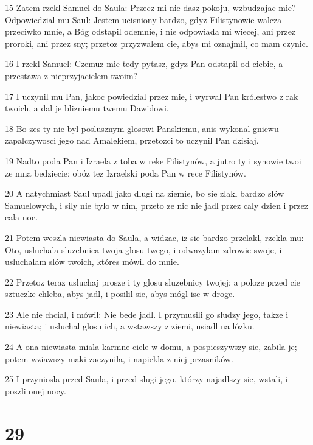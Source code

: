\par 15 Zatem rzekl Samuel do Saula: Przecz mi nie dasz pokoju, wzbudzajac mie? Odpowiedzial mu Saul: Jestem ucisniony bardzo, gdyz Filistynowie walcza przeciwko mnie, a Bóg odstapil odemnie, i nie odpowiada mi wiecej, ani przez proroki, ani przez sny; przetoz przyzwalem cie, abys mi oznajmil, co mam czynic.
\par 16 I rzekl Samuel: Czemuz mie tedy pytasz, gdyz Pan odstapil od ciebie, a przestawa z nieprzyjacielem twoim?
\par 17 I uczynil mu Pan, jakoc powiedzial przez mie, i wyrwal Pan królestwo z rak twoich, a dal je blizniemu twemu Dawidowi.
\par 18 Bo zes ty nie byl poslusznym glosowi Panskiemu, anis wykonal gniewu zapalczywosci jego nad Amalekiem, przetozci to uczynil Pan dzisiaj.
\par 19 Nadto poda Pan i Izraela z toba w reke Filistynów, a jutro ty i synowie twoi ze mna bedziecie; obóz tez Izraelski poda Pan w rece Filistynów.
\par 20 A natychmiast Saul upadl jako dlugi na ziemie, bo sie zlakl bardzo slów Samuelowych, i sily nie bylo w nim, przeto ze nic nie jadl przez caly dzien i przez cala noc.
\par 21 Potem weszla niewiasta do Saula, a widzac, iz sie bardzo przelakl, rzekla mu: Oto, usluchala sluzebnica twoja glosu twego, i odwazylam zdrowie swoje, i usluchalam slów twoich, któres mówil do mnie.
\par 22 Przetoz teraz usluchaj prosze i ty glosu sluzebnicy twojej; a poloze przed cie sztuczke chleba, abys jadl, i posilil sie, abys mógl isc w droge.
\par 23 Ale nie chcial, i mówil: Nie bede jadl. I przymusili go sludzy jego, takze i niewiasta; i usluchal glosu ich, a wstawszy z ziemi, usiadl na lózku.
\par 24 A ona niewiasta miala karmne ciele w domu, a pospieszywszy sie, zabila je; potem wziawszy maki zaczynila, i napiekla z niej przasników.
\par 25 I przyniosla przed Saula, i przed slugi jego, którzy najadlszy sie, wstali, i poszli onej nocy.

\chapter{29}

